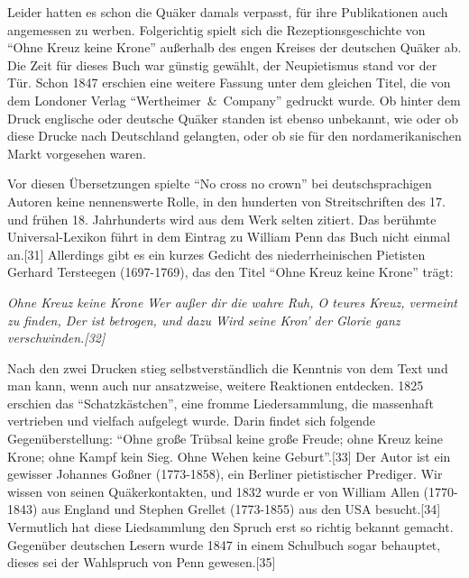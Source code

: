 \medskip

Leider hatten es schon die Quäker damals verpasst, für ihre Publikationen auch
angemessen zu werben. Folgerichtig spielt sich die Rezeptionsgeschichte von
"`Ohne Kreuz keine Krone"' außerhalb des engen Kreises der deutschen Quäker ab.
Die Zeit für dieses Buch war günstig gewählt, der Neupietismus stand vor der
Tür. Schon 1847 erschien eine weitere Fassung unter dem gleichen Titel, die von
dem Londoner Verlag "`Wertheimer~\&~Company"' gedruckt wurde. Ob hinter dem Druck
englische oder deutsche Quäker standen ist ebenso unbekannt, wie oder ob diese
Drucke nach Deutschland gelangten, oder ob sie für den nordamerikanischen Markt
vorgesehen waren.

\medskip

Vor diesen Übersetzungen spielte "`No cross no crown"' bei deutschsprachigen
Autoren keine nennenswerte Rolle, in den hunderten von Streitschriften des 17.
und frühen 18. Jahrhunderts wird aus dem Werk selten zitiert. Das berühmte
Universal-Lexikon führt in dem Eintrag zu William Penn das Buch nicht einmal
an.[31] Allerdings gibt es ein kurzes Gedicht des niederrheinischen Pietisten
Gerhard Tersteegen (1697-1769), das den Titel "`Ohne Kreuz keine Krone"' trägt:

\medskip
\begin{center}
\parbox{7,5cm}{
\textit{
Ohne Kreuz keine Krone
Wer außer dir die wahre Ruh,
O teures Kreuz, vermeint zu finden,
Der ist betrogen, und dazu
Wird seine Kron’ der Glorie ganz verschwinden.[32]}
}
\end{center}

\medskip


Nach den zwei Drucken stieg selbstverständlich die Kenntnis von dem Text und man
kann, wenn auch nur ansatzweise, weitere Reaktionen entdecken. 1825 erschien das
"`Schatzkästchen"', eine fromme Liedersammlung, die massenhaft vertrieben und
vielfach aufgelegt wurde. Darin findet sich folgende Gegenüberstellung: "`Ohne
große Trübsal keine große Freude; ohne Kreuz keine Krone; ohne Kampf kein Sieg.
Ohne Wehen keine Geburt"'.[33] Der Autor ist ein gewisser Johannes Goßner
(1773-1858), ein Berliner pietistischer Prediger. Wir wissen von seinen
Quäkerkontakten, und 1832 wurde er von William Allen (1770-1843) aus England und
Stephen Grellet (1773-1855) aus den USA besucht.[34] Vermutlich hat diese
Liedsammlung den Spruch erst so richtig bekannt gemacht. Gegenüber deutschen
Lesern wurde 1847 in einem Schulbuch sogar behauptet, dieses sei der Wahlspruch
von Penn gewesen.[35]

